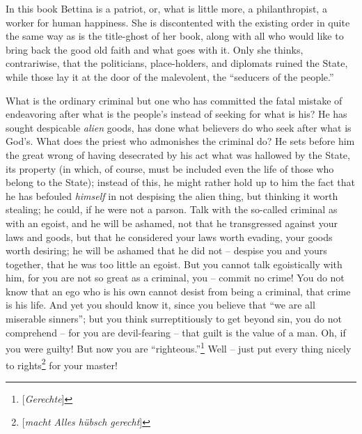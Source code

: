 \documentclass[12pt,a4paper]{book}
\begin{document}
In this book Bettina is a patriot, or, what is little more, a philanthropist, 
a worker for human happiness. She is discontented with the existing order in 
quite the same way as is the title-ghost of her book, along with all who would 
like to bring back the good old faith and what goes with it. Only she thinks, 
contrariwise, that the politicians, place-holders, and diplomats ruined the 
State, while those lay it at the door of the malevolent, the ``seducers of 
the people.''

What is the ordinary criminal but one who has committed the fatal mistake of 
endeavoring after what is the people's instead of seeking for what is his? He 
has sought despicable \textit{alien} goods, has done what believers do who 
seek after what is God's. What does the priest who admonishes the criminal do? 
He sets before him the great wrong of having desecrated by his act what was 
hallowed by the State, its property (in which, of course, must be included 
even the life of those who belong to the State); instead of this, he might 
rather hold up to him the fact that he has befouled \textit{himself} in not 
despising the alien thing, but thinking it worth stealing; he could, if he 
were not a parson. Talk with the so-called criminal as with an egoist, and he 
will be ashamed, not that he transgressed against your laws and goods, but 
that he considered your laws worth evading, your goods worth desiring; he will 
be ashamed that he did not -- despise you and yours together, that he was too 
little an egoist. But you cannot talk egoistically with him, for you are not 
so great as a criminal, you -- commit no crime! You do not know that an ego 
who is his own cannot desist from being a criminal, that crime is his life. 
And yet you should know it, since you believe that ``we are all miserable 
sinners''; but you think surreptitiously to get beyond sin, you do not 
comprehend -- for you are devil-fearing -- that guilt is the value of a man. 
Oh, if you were guilty! But now you are 
``righteous.''\footnote{[\textit{Gerechte}]} Well -- just put every thing 
nicely to rights\footnote{[\textit{macht Alles h\"ubsch gerecht}]} for your 
master!
\end{document}
